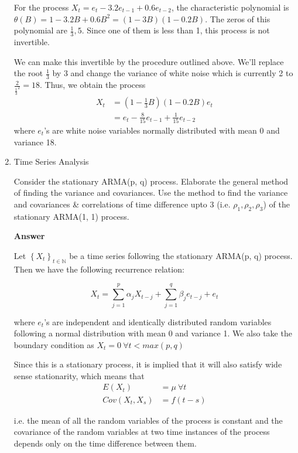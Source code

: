 \documentclass[12pt, oneside]{article}
\begin{document}
\begin{enumerate}
{    For the process \(X_t = e_t - 3.2 e_{t-1} + 0.6 e_{t-2}\), the characteristic polynomial
    is \(\theta(B) = 1 - 3.2 B + 0.6 B^2 = (1 - 3 B)(1 - 0.2 B)\). The zeros of this
    polynomial are \(\frac{1}{3}, 5\). Since one of them is less than 1, this process is not
    invertible.

    We can make this invertible by the procedure outlined above. We'll replace the root
    \(\frac{1}{3}\) by 3 and change the variance of white noise which is currently 2 to
    \(\frac{2}{\frac{1}{3}^2} = 18\). Thus, we obtain the process
    \begin{align*}
        X_t &= (1 - \frac{1}{3} B)(1 - 0.2 B) e_t \\
            &= e_t - \frac{8}{15} e_{t-1} + \frac{1}{15} e_{t-2}
    \end{align*}
    where \(e_t\)'s are white noise variables normally distributed with mean 0 and variance 18.
}


\item {
    Time Series Analysis

    Consider the stationary ARMA(p, q) process. Elaborate the general method of finding the
    variance and covariances. Use the method to find the variance and covariances \&
    correlations of time difference upto 3 (i.e. \(\rho_1, \rho_2, \rho_3\)) of the stationary ARMA(1, 1)
    process.

    \textbf{Answer}

    Let \(\left\{X_t\right\}_{t \in \mathbb{N}}\) be a time series following the
    stationary ARMA(p, q) process. Then we have the following recurrence relation:

    \[X_t = \sum_{j=1}^{p}\alpha_j X_{t-j} + \sum_{j=1}^{q} \beta_j e_{t-j} + e_t\]

    where \(e_t\)'s are independent and identically distributed random variables following
    a normal distribution with mean 0 and variance 1. We also take the boundary condition as
    \(X_t = 0 ~\forall t < max(p, q)\)

    Since this is a stationary process, it is implied that it will also satisfy
    wide sense stationarity, which means that
    \begin{align*}
        E(X_t) &= \mu ~\forall t \\
        Cov(X_t, X_s) &= f(t - s)
    \end{align*}

    i.e. the mean of all the random variables of the process is constant and
    the covariance of the random variables at two time instances of the process
    depends only on the time difference between them.

}
\end{enumerate}
\end{document}
